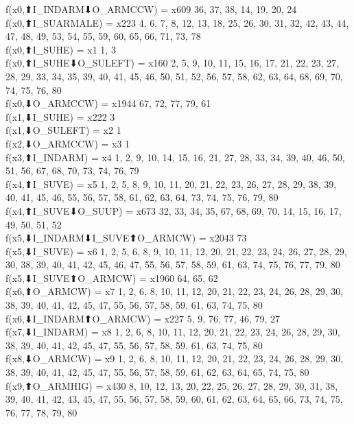 f(x0,⬆I_INDARM⬇O_ARMCCW) = x609 {36, 37, 38, 14, 19, 20, 24} \\
f(x0,⬆I_SUARMALE) = x223 {4, 6, 7, 8, 12, 13, 18, 25, 26, 30, 31, 32, 42, 43, 44, 47, 48, 49, 53, 54, 55, 59, 60, 65, 66, 71, 73, 78} \\
f(x0,⬆I_SUHE) = x1 {1, 3} \\
f(x0,⬆I_SUHE⬇O_SULEFT) = x160 {2, 5, 9, 10, 11, 15, 16, 17, 21, 22, 23, 27, 28, 29, 33, 34, 35, 39, 40, 41, 45, 46, 50, 51, 52, 56, 57, 58, 62, 63, 64, 68, 69, 70, 74, 75, 76, 80} \\
f(x0,⬇O_ARMCCW) = x1944 {67, 72, 77, 79, 61} \\
f(x1,⬇I_SUHE) = x222 {3} \\
f(x1,⬇O_SULEFT) = x2 {1} \\
f(x2,⬇O_ARMCCW) = x3 {1} \\
f(x3,⬆I_INDARM) = x4 {1, 2, 9, 10, 14, 15, 16, 21, 27, 28, 33, 34, 39, 40, 46, 50, 51, 56, 67, 68, 70, 73, 74, 76, 79} \\
f(x4,⬆I_SUVE) = x5 {1, 2, 5, 8, 9, 10, 11, 20, 21, 22, 23, 26, 27, 28, 29, 38, 39, 40, 41, 45, 46, 55, 56, 57, 58, 61, 62, 63, 64, 73, 74, 75, 76, 79, 80} \\
f(x4,⬆I_SUVE⬇O_SUUP) = x673 {32, 33, 34, 35, 67, 68, 69, 70, 14, 15, 16, 17, 49, 50, 51, 52} \\
f(x5,⬇I_INDARM⬇I_SUVE⬆O_ARMCW) = x2043 {73} \\
f(x5,⬇I_SUVE) = x6 {1, 2, 5, 6, 8, 9, 10, 11, 12, 20, 21, 22, 23, 24, 26, 27, 28, 29, 30, 38, 39, 40, 41, 42, 45, 46, 47, 55, 56, 57, 58, 59, 61, 63, 74, 75, 76, 77, 79, 80} \\
f(x5,⬇I_SUVE⬆O_ARMCW) = x1960 {64, 65, 62} \\
f(x6,⬆O_ARMCW) = x7 {1, 2, 6, 8, 10, 11, 12, 20, 21, 22, 23, 24, 26, 28, 29, 30, 38, 39, 40, 41, 42, 45, 47, 55, 56, 57, 58, 59, 61, 63, 74, 75, 80} \\
f(x6,⬇I_INDARM⬆O_ARMCW) = x227 {5, 9, 76, 77, 46, 79, 27} \\
f(x7,⬇I_INDARM) = x8 {1, 2, 6, 8, 10, 11, 12, 20, 21, 22, 23, 24, 26, 28, 29, 30, 38, 39, 40, 41, 42, 45, 47, 55, 56, 57, 58, 59, 61, 63, 74, 75, 80} \\
f(x8,⬇O_ARMCW) = x9 {1, 2, 6, 8, 10, 11, 12, 20, 21, 22, 23, 24, 26, 28, 29, 30, 38, 39, 40, 41, 42, 45, 47, 55, 56, 57, 58, 59, 61, 62, 63, 64, 65, 74, 75, 80} \\
f(x9,⬆O_ARMHIG) = x430 {8, 10, 12, 13, 20, 22, 25, 26, 27, 28, 29, 30, 31, 38, 39, 40, 41, 42, 43, 45, 47, 55, 56, 57, 58, 59, 60, 61, 62, 63, 64, 65, 66, 73, 74, 75, 76, 77, 78, 79, 80} \\
